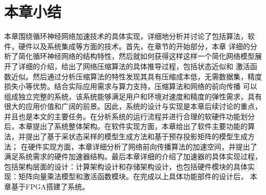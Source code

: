 \section{本章小结}
本章围绕循环神经网络加速技术的具体实现，详细地分析并讨论了包括算法，软件，硬件以及系统集成等方面的技术。首先，在章节的开始部分，本章
详细的分析了简化循环神经网络的结构特性，然后就如何获得这样这样一个简化网络模型展开了详细的介绍，给出了网络压缩算法的具体推导过程，包括状态近似和
激活函数近似。然后通过分析压缩算法的特性发现其具有压缩成本低，无需数据集，精度损失小等优势。结合实际应用需求与算力支持，压缩算法和网络的前向传播
可以组成独立完整的系统，该系统能够满足用户和环境对速度和精度的弹性需求，具有很大的应用价值和广阔的前景。因此，系统的设计与实现是本章后续讨论的重点，
并且也是本文的主要任务。在分析系统的运行流程并进行合理的软硬件功能划分后，本章提出了系统整体架构。在软件实现方面，本章给出了软件主要功能的算法，并提出了基于采状态采样的模型生成方法和基于预存投影矩阵的模型生成方法；
在硬件实现方面，本章详细分析了网络前向传播算法的加速空间，并提出了满足系统需求的硬件加速器结构。最后本章详细的介绍了加速器的具体实现过程，
包括架构层面的设计：计算架构设计和存储架构设计，也包括硬件模块的具体实现：矩阵向量乘法模型和激活函数模块。在完成以上具体功能部件的设计后，
本章基于FPGA搭建了系统。

